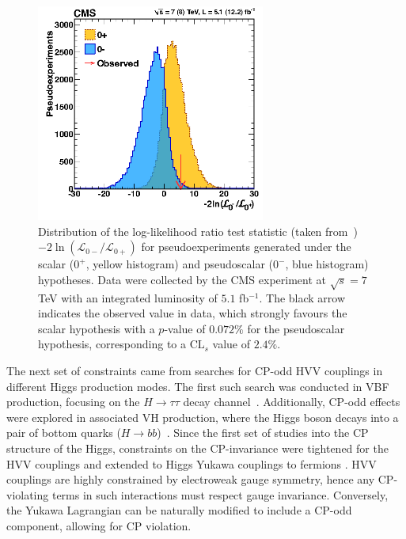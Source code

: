 \begin{figure}[!htbp]
\centering
\includegraphics[width= 0.67\textwidth]{Figures/Chapter2/SpinParity.png}
\caption[Log-likelihood ratio test statistic for scalar vs pseudoscalar hypotheses]{Distribution of the log-likelihood ratio test statistic (taken from~\cite{CP_constraints_2}) $-2\ln(\mathcal{L}_{0-}/\mathcal{L}_{0+})$ for pseudoexperiments generated under the scalar ($0^+$, yellow histogram) and pseudoscalar ($0^-$, blue histogram) hypotheses. Data were collected by the \ac{CMS} experiment at $\sqrt{s} = 7$ TeV with an integrated luminosity of $5.1$ fb$^{-1}$. The black arrow indicates the observed value in data, which strongly favours the scalar hypothesis with a $p$-value of $0.072\%$ for the pseudoscalar hypothesis, corresponding to a $\text{CL}_s$ value of $2.4\%$.}\label{Figure:Chapter2_CPevenVsCPodd}
\end{figure}

The next set of constraints came from searches for CP-odd 
HVV couplings in different Higgs production modes. The first such search was conducted in VBF production, focusing on the 
$H\to\tau\tau$ decay channel~\cite{CP_constraints_4}. Additionally, CP-odd effects were explored in associated VH production, where the Higgs boson decays into a pair of bottom quarks ($H\to bb$)~\cite{CP_constraints_5}. Since the first set of studies into the CP structure of the Higgs, constraints on the CP-invariance were tightened for the HVV couplings and extended to Higgs Yukawa couplings to fermions \cite{CP_constraints_6,CP_constraints_7,CP_constraints_8,CP_constraints_9,CP_constraints_10,CP_constraints_11,CP_constraints_12,CP_constraints_13,HiggsCP_CMS_2021,CP_constraints_15,CP_constraints_16,CP_constraints_17,CP_constraints_18,CP_constraints_19,CP_constraints_20,CP_constraints_21,CP_constraints_22}. HVV couplings are highly constrained by electroweak gauge symmetry, hence any CP-violating terms in such interactions must respect gauge invariance. Conversely, the Yukawa Lagrangian can be naturally modified to include a CP-odd component, allowing for CP violation.

